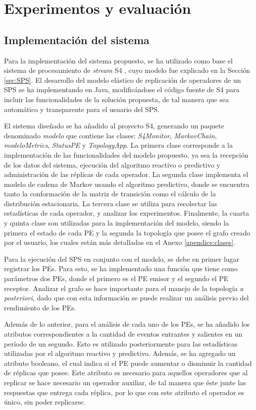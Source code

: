 \chapter{Experimentos y evaluación}
\label{cap:experimentos}

\section{Implementación del sistema}
Para la implementación del sistema propuesto, se ha utilizado como base el sistema de procesamiento de \textit{stream} S4 \citep{s4}, cuyo modelo fue explicado en la Sección \ref{sec:SPS}. El desarrollo del modelo elástico de replicación de operadores de un SPS se ha implementando en Java, modificándose el código fuente de S4 para incluir las funcionalidades de la solución propuesta, de tal manera que sea automático y transparente para el usuario del SPS.

El sistema diseñado se ha añadido al proyecto S4, generando un paquete denominado \textit{modelo} que contiene las clases: \textit{S4Monitor}, \textit{MarkovChain}, \textit{modeloMetrics}, \textit{StatusPE} y \textit{\mbox{TopologyApp}}. La primera clase corresponde a la implementación de las funcionalidades del modelo propuesto, ya sea la recepción de los datos del sistema, ejecución del algoritmo reactivo o predictivo y administración de las réplicas de cada operador. La segunda clase implementa el modelo de cadena de Markov usando el algoritmo predictivo, donde se encuentra tanto la conformación de la matriz de transición como el cálculo de la distribución estacionaria. La tercera clase se utiliza para recolectar las estadísticas de cada operador, y analizar los experimentos. Finalmente, la cuarta y quinta clase son utilizadas para la implementación del modelo, siendo la primera el estado de cada PE y la segunda la topología que posee el grafo creado por el usuario, los cuales están más detalladas en el Anexo \ref{apendice:clases}.

Para la ejecución del SPS en conjunto con el modelo, se debe en primer lugar registrar los PEs. Para esto, se ha implementado una función que tiene como parámetros dos PEs, donde el primero es el PE emisor y el segundo el PE receptor. Analizar el grafo se hace importante para el manejo de la topología \textit{a posteriori}, dado que con esta información se puede realizar un análisis previo del rendimiento de los PEs.

Además de lo anterior, para el análisis de cada uno de los PEs, se ha añadido los atributos correspondientes a la cantidad de eventos entrantes y salientes en un período de un segundo. Esto es utilizado posteriormente para las estadísticas utilizadas por el algoritmo reactivo y predictivo. Además, se ha agregado un atributo booleano, el cual indica si el PE puede aumentar o disminuir la cantidad de réplicas que posee. Este atributo es necesario para aquellos operadores que al replicar se hace necesario un operador auxiliar, de tal manera que éste junte las respuestas que entrega cada réplica, por lo que con este atributo el operador es único, sin poder replicarse.

